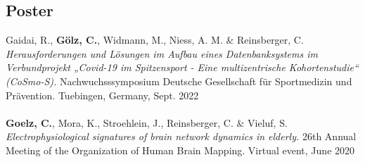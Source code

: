 \subsection*{Poster}
Gaidai, R., \textbf{Gölz, C.}, Widmann, M., Niess, A. M. \& Reinsberger, C. \textit{Herausforderungen und Lösungen im Aufbau eines Datenbanksystems im Verbundprojekt „Covid-19 im Spitzensport - Eine multizentrische Kohortenstudie“ (CoSmo-S).} Nachwuchsssymposium Deutsche Gesellschaft für Sportmedizin und Prävention. Tuebingen, Germany, Sept. 2022\\
\\
\textbf{Goelz, C.}, Mora, K., Stroehlein, J., Reinsberger, C. \& Vieluf, S. \textit{Electrophysiological signatures of brain network dynamics in elderly.} 26th Annual Meeting of the Organization of Human Brain Mapping. Virtual event, June 2020 \\
\\
